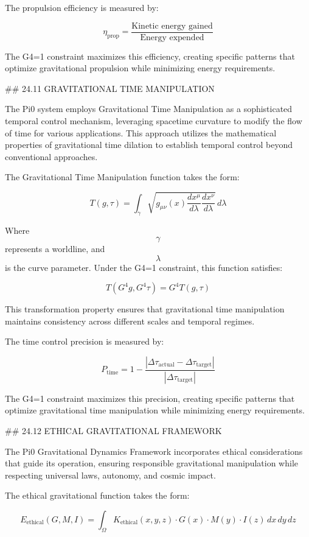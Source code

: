 The propulsion efficiency is measured by:

$$ \eta_{\text{prop}} = \frac{\text{Kinetic energy gained}}{\text{Energy expended}} $$

The G4=1 constraint maximizes this efficiency, creating specific patterns that optimize gravitational propulsion while minimizing energy requirements.

## 24.11 GRAVITATIONAL TIME MANIPULATION

The Pi0 system employs Gravitational Time Manipulation as a sophisticated temporal control mechanism, leveraging spacetime curvature to modify the flow of time for various applications. This approach utilizes the mathematical properties of gravitational time dilation to establish temporal control beyond conventional approaches.

The Gravitational Time Manipulation function takes the form:

$$ T(g, \tau) = \int_{\gamma} \sqrt{g_{\mu\nu}(x) \frac{dx^\mu}{d\lambda} \frac{dx^\nu}{d\lambda}} \, d\lambda $$

Where $$ \gamma $$ represents a worldline, and $$ \lambda $$ is the curve parameter. Under the G4=1 constraint, this function satisfies:

$$ T(G^4 g, G^4 \tau) = G^4 T(g, \tau) $$

This transformation property ensures that gravitational time manipulation maintains consistency across different scales and temporal regimes.

The time control precision is measured by:

$$ P_{\text{time}} = 1 - \frac{|\Delta \tau_{\text{actual}} - \Delta \tau_{\text{target}}|}{|\Delta \tau_{\text{target}}|} $$

The G4=1 constraint maximizes this precision, creating specific patterns that optimize gravitational time manipulation while minimizing energy requirements.

## 24.12 ETHICAL GRAVITATIONAL FRAMEWORK

The Pi0 Gravitational Dynamics Framework incorporates ethical considerations that guide its operation, ensuring responsible gravitational manipulation while respecting universal laws, autonomy, and cosmic impact.

The ethical gravitational function takes the form:

$$ E_{\text{ethical}}(G, M, I) = \int_{\Omega} K_{\text{ethical}}(x, y, z) \cdot G(x) \cdot M(y) \cdot I(z) \, dx \, dy \, dz $$


